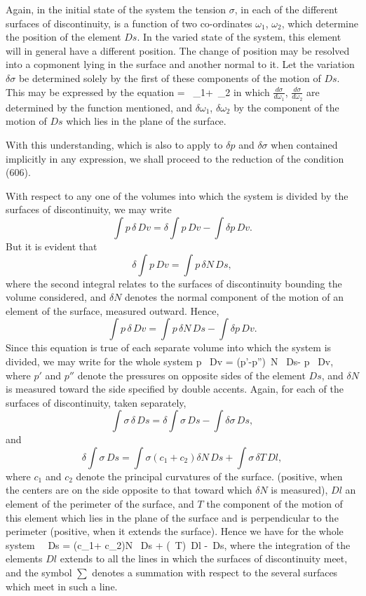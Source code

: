 \documentclass[12pt]{memoir}
\newcommand{\dd}{\delta}
\begin{document}
Again, in the initial state of the system the tension $\sigma$, in each of the different surfaces of discontinuity, is a function of two co-ordinates $\omega_1$, $\omega_2$, which determine the position of the element $Ds$. In the varied state of the system, this element will in general have a different position. The change of position may be resolved into a copmonent lying in the surface and another normal to it. Let the variation $\dd \sigma$ be determined solely by the first of these components of the motion of $Ds$. This may be expressed by the equation
\eqs \dd \sigma= \, \dd \omega_1+\, \dd \omega_2   \label{608} \eqe
in which $\frac{d\sigma}{d\omega_1}$, $\frac{d\sigma}{d\omega_2}$ are determined by the function mentioned, and $\dd \omega_1$, $\dd \omega_2$ by the component of the motion of $Ds$ which lies in the plane of the surface.

With this understanding, which is also to apply to $\dd p$ and $\dd \sigma$ when contained implicitly in any expression, we shall proceed to the reduction of the condition (606).

With respect to any one of the volumes into which the system is divided by the surfaces of discontinuity, we may write
$$ \int p \, \dd \, Dv = \dd \int p \, Dv- \int \dd p \, Dv. $$
But it is evident that
$$ \dd \int p \, Dv = \int p \, \dd N \, Ds, $$
where the second integral relates to the surfaces of discontinuity bounding the volume considered, and $\dd N$ denotes the normal component of the motion of an element of the surface, measured outward. Hence,
$$ \int p \, \dd \, Dv = \int p \, \dd N \, Ds -\int \dd p \, Dv. $$
Since this equation is true of each separate volume into which the system is divided, we may write for the whole system
\eqs \int p \, \dd Dv = \int(p'-p'')\, \dd N \, Ds- \int \dd p \, Dv, \label{609} \eqe
where $p'$ and $p''$ denote the pressures on opposite sides of the element $Ds$, and $\dd N$ is measured toward the side specified by double accents. Again, for each of the surfaces of discontinuity, taken separately,
$$ \int \sigma \, \dd \, Ds =  \dd \int \sigma \, Ds-\int \dd \sigma \, Ds, $$
and
$$ \dd \int \sigma \, Ds = \int \sigma (c_1+ c_2)\dd N \, Ds+ \int \sigma  \, \dd T \, Dl, $$
where $c_1$ and $c_2$ denote the principal curvatures of the surface. (positive, when the centers are on the side opposite to that toward which $\dd N$ is measured), $Dl$ an element of the perimeter of the surface, and $T$ the component of the motion of this element which lies in the plane of the surface and is perpendicular to the perimeter (positive, when it extends the surface). Hence we have for the whole system
\eqs \int \sigma \, \dd \, Ds = \int \sigma (c_1+ c_2)\dd N \, Ds + \int \sum(\sigma\, \dd T)\, Dl -\int \dd \sigma \, Ds,  \label{610} \eqe
where the integration of the elements $Dl$ extends to all the lines in which the surfaces of discontinuity meet, and the symbol $\sum$ denotes a summation with respect to the several surfaces which meet in such a line.
\end{document}
